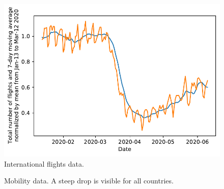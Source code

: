 \begin{figure}[hb!]
	\centering
	\includegraphics[width=0.7\linewidth]{../predictions/flights.pdf}
	\caption{International flights data.}
	\label{fig:flights}
\end{figure}


\begin{figure}[h!]
	\centering
	\hfill
	\caption{Mobility data. A steep drop is visible for all countries.}
	\label{fig:driving}
\end{figure}

